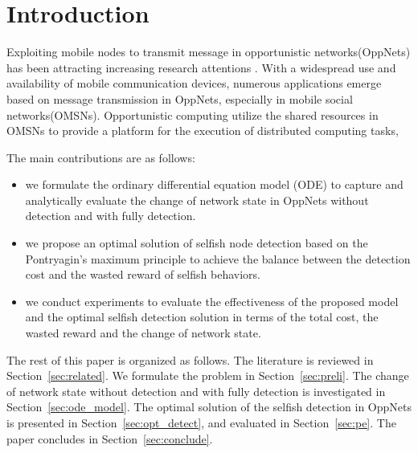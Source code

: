 \section{Introduction}
\label{sec:intro}
Exploiting mobile nodes to transmit message in
opportunistic networks(OppNets) has been attracting
increasing research attentions
\cite{DBLP:conf/sigcomm/SouzaMSMCC16,
DBLP:conf/infocom/LuSP16,
DBLP:conf/mobicom/RadenkovicH17,
DBLP:conf/infocom/SakaiSK19,
DBLP:journals/comsur/JedariXN18,
DBLP:journals/tmc/LoretiB20}.
With a widespread use and availability of
mobile communication devices, numerous applications
emerge based on message transmission in OppNets, especially in mobile social networks(OMSNs).
Opportunistic computing utilize the shared resources
in  OMSNs to provide a platform for the execution of
distributed computing tasks,



The main contributions are as follows:

\begin{itemize}
\item {we formulate the ordinary differential equation model (ODE)
to capture and analytically evaluate the change of network state
in OppNets without detection and with fully detection.}
\item {we propose an optimal solution of selfish node detection
based on the Pontryagin's maximum principle
to achieve the balance between the detection cost
and the wasted reward of selfish behaviors.
}
\item {we conduct experiments to evaluate
the effectiveness of the proposed model
and the optimal selfish detection solution in terms of the total cost,
the wasted reward and the change of network state.
}
\end{itemize}

The rest of this paper is organized as follows.
The literature is reviewed in Section~\ref{sec:related}.
We formulate the problem in Section~\ref{sec:preli}.
The change of network state without detection and with fully detection
is investigated in Section~\ref{sec:ode_model}.
The optimal solution of the selfish detection in OppNets
is presented in Section~\ref{sec:opt_detect},
and evaluated in Section~\ref{sec:pe}.
The paper concludes in Section~\ref{sec:conclude}. 